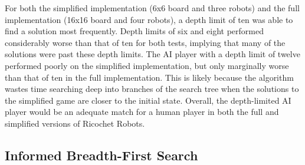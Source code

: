\documentclass[a4paper,10pt]{article}
\begin{document}
  For both the simplified implementation (6x6 board and three robots) and the full implementation (16x16 board and four robots), a depth limit of ten was able to
  find a solution most frequently.  Depth limits of six and eight performed considerably worse than that of ten for both tests, implying that many of the solutions were
  past these depth limits.  The AI player with a depth limit of twelve performed poorly on the simplified implementation, but only marginally worse than that of ten in
  the full implementation.  This is likely because the algorithm wastes time searching deep into branches of the search tree when the solutions to the simplified game
  are closer to the initial state.  Overall, the depth-limited AI player would be an adequate match for a human player in both the full and simplified versions of
  Ricochet Robots.\\



  \subsection{Informed Breadth-First Search}
\end{document}
